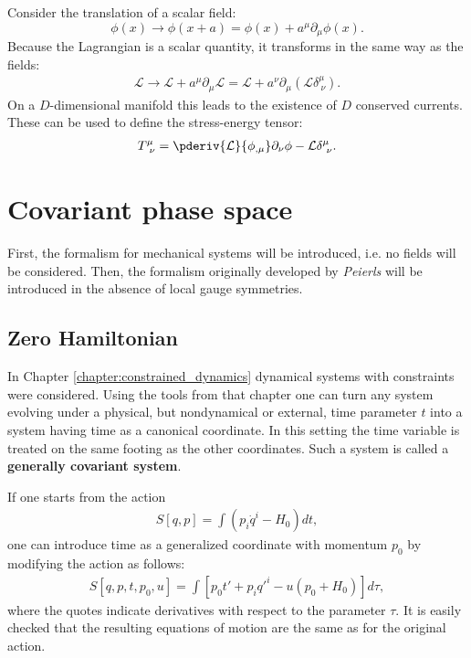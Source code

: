     \begin{definition}
        Consider the translation of a scalar field: \[\phi(x)\longrightarrow\phi(x+a) = \phi(x) + a^\mu\partial_\mu\phi(x).\] Because the Lagrangian is a scalar quantity, it transforms in the same way as the fields:
        \begin{gather}
            \mathcal{L}\longrightarrow\mathcal{L} + a^\mu\partial_\mu\mathcal{L} = \mathcal{L} + a^\nu\partial_\mu(\mathcal{L}\delta^\mu_{\ \nu}).
        \end{gather}
        On a $D$-dimensional manifold this leads to the existence of $D$ conserved currents. These can be used to define the stress-energy tensor:
        \begin{gather}
            \label{field:stress_energy_tensor}
            T^\mu_{\ \nu} = \pderiv{\mathcal{L}}{\phi_{,\mu}}\partial_\nu\phi - \mathcal{L}\delta^\mu_{\ \nu}.
        \end{gather}
    \end{definition}

\section{Covariant phase space}

    First, the formalism for mechanical systems will be introduced, i.e. no fields will be considered. Then, the formalism originally developed by \textit{Peierls} will be introduced in the absence of local gauge symmetries.

\subsection{Zero Hamiltonian}

    In Chapter \ref{chapter:constrained_dynamics} dynamical systems with constraints were considered. Using the tools from that chapter one can turn any system evolving under a physical, but nondynamical or external, time parameter $t$ into a system having time as a canonical coordinate. In this setting the time variable is treated on the same footing as the other coordinates. Such a system is called a \textbf{generally covariant system}.

    If one starts from the action
    \begin{gather}
        S[q,p] = \int\left(p_i\dot{q}^i-H_0\right)dt,
    \end{gather}
    one can introduce time as a generalized coordinate with momentum $p_0$ by modifying the action as follows:
    \begin{gather}
        S[q,p,t,p_0,u] = \int\left[p_0t'+p_iq'^i-u(p_0+H_0)\right]d\tau,
    \end{gather}
    where the quotes indicate derivatives with respect to the parameter $\tau$. It is easily checked that the resulting equations of motion are the same as for the original action.

